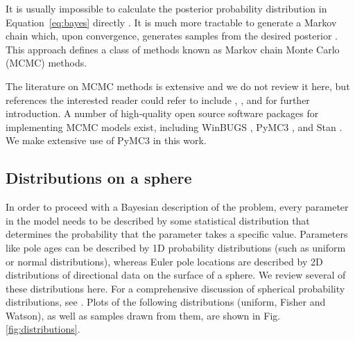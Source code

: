\documentclass[11pt,letterpaper]{article}
\begin{document}
It is usually impossible to calculate the posterior probability distribution in Equation~\eqref{eq:bayes} directly \citep{Davidson-Pilon2015a}.  It is much more tractable to generate a Markov chain which, upon convergence, generates samples from the desired posterior \citep{Gelman2013a}. This approach defines a class of methods known as Markov chain Monte Carlo (MCMC) methods.

The literature on MCMC methods is extensive and we do not review it here, but references the interested reader could refer to include \cite{Gelman1996a}, \cite{Sambridge2013a}, and \cite{Davidson-Pilon2015a} for further introduction. A number of high-quality open source software packages for implementing MCMC models exist, including WinBUGS \citep{Lunn2000a}, PyMC3 \citep{Salvatier2016a}, and Stan \citep{Carpenter2017a}. We make extensive use of PyMC3 in this work.

\subsection*{Distributions on a sphere}

In order to proceed with a Bayesian description of the problem, every parameter in the model needs to be described by some statistical distribution that determines the probability that the parameter takes a specific value. Parameters like pole ages can be described by 1D probability distributions (such as uniform or normal distributions), whereas Euler pole locations are described by 2D distributions of directional data on the surface of a sphere. We review several of these distributions here. For a comprehensive discussion of spherical probability distributions, see \cite{Fisher1987b}. Plots of the following distributions (uniform, Fisher and Watson), as well as samples drawn from them, are shown in Fig. \ref{fig:distributions}. 
\end{document}
